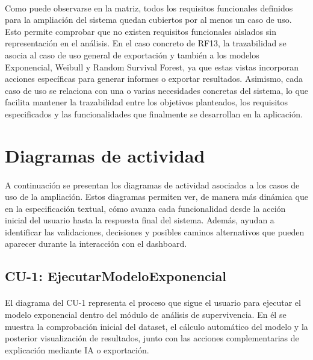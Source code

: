 \paragraph*{}Como puede observarse en la matriz, todos los requisitos funcionales definidos para la ampliación del sistema quedan cubiertos por al menos un caso de uso. Esto permite comprobar que no existen requisitos funcionales aislados sin representación en el análisis. En el caso concreto de RF13, la trazabilidad se asocia al caso de uso general de exportación y también a los modelos Exponencial, Weibull y Random Survival Forest, ya que estas vistas incorporan acciones específicas para generar informes o exportar resultados. Asimismo, cada caso de uso se relaciona con una o varias necesidades concretas del sistema, lo que facilita mantener la trazabilidad entre los objetivos planteados, los requisitos especificados y las funcionalidades que finalmente se desarrollan en la aplicación.


\newpage


\section{Diagramas de actividad}

\paragraph*{}A continuación se presentan los diagramas de actividad asociados a los casos de uso de la ampliación. Estos diagramas permiten ver, de manera más dinámica que en la especificación textual, cómo avanza cada funcionalidad desde la acción inicial del usuario hasta la respuesta final del sistema. Además, ayudan a identificar las validaciones, decisiones y posibles caminos alternativos que pueden aparecer durante la interacción con el dashboard.

\subsection{CU-1: EjecutarModeloExponencial}
\paragraph*{}El diagrama del CU-1 representa el proceso que sigue el usuario para ejecutar el modelo exponencial dentro del módulo de análisis de supervivencia. En él se muestra la comprobación inicial del dataset, el cálculo automático del modelo y la posterior visualización de resultados, junto con las acciones complementarias de explicación mediante IA o exportación.

